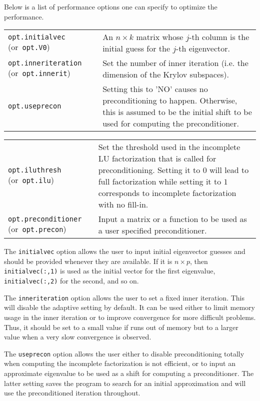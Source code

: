 \documentclass[acmtoms]{acmtrans2m}
\begin{document}
Below is a list of performance options one can specify to optimize 
the performance. 


\medskip 

\begin{tabular}{p{1.5in}p{3in}}

{\tt opt.initialvec} \mbox{(or {\tt opt.V0})}
& An $n \times k$ matrix whose $j$-th column is the initial guess for the $j$-th eigenvector.   \\

{\tt opt.inneriteration} \mbox{(or {\tt opt.innerit})}
& Set the number of inner iteration (i.e. the dimension of the Krylov subspaces).  \\
{\tt opt.useprecon} & Setting this to 'NO' causes no preconditioning to happen. Otherwise, this is assumed to be the
initial shift to be used for computing the preconditioner.\\
\end{tabular}

\begin{tabular}{p{1.5in}p{3in}}
{\tt opt.iluthresh} \mbox{(or {\tt opt.ilu})}
& Set  the threshold used in the incomplete LU 
factorization that is called for preconditioning. Setting it to $0$ 
will lead to full  factorization while setting it to $1$ 
corresponds to incomplete factorization with no fill-in. \\
{\tt opt.preconditioner} \mbox{(or {\tt opt.precon})}
& Input a matrix or a function to be used as a user specified preconditioner.\\
\end{tabular}

\medskip

The {\tt initialvec} option allows the user to input  initial eigenvector guesses and should be provided whenever they are available.
If it is  
$n \times p$, then {\tt initialvec(:,1)} is used as the initial vector 
for the first eigenvalue, 
{\tt initialvec(:,2)} for the second, and so on. 

The {\tt inneriteration} option allows the user to set a fixed inner iteration. This will disable the adaptive setting by default. 
It can be used either to limit memory usage in the inner iteration
or to   improve convergence for more 
difficult problems.  
Thus, it should be set to a 
small value if \eigifp runs out of memory but to 
a larger value when a very slow convergence is observed.

The  {\tt useprecon} option allows the user either 
to disable preconditioning totally when computing the incomplete factorization is not efficient,   
or   to input an approximate eigenvalue to be used as a   
shift for computing a preconditioner. The latter setting saves 
the program to search for an initial approximation and will use 
the preconditioned iteration throughout.   
\end{document}
